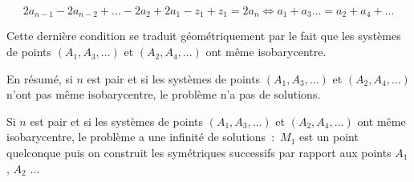{{$$2a_{n-1}-2a_{n-2}+...-2a_2+2a_1-z_1+z_1=2a_n\Leftrightarrow a_1+a_3...=a_2+a_4+...$$

Cette dernière condition se traduit géométriquement par le fait que les systèmes de points $(A_1,A_3,...)$ et
$(A_2,A_4,...)$ ont même isobarycentre.

En résumé, si $n$ est pair et si les systèmes de points $(A_1,A_3,...)$ et $(A_2,A_4,...)$ n'ont pas même isobarycentre, le problème n'a pas de solutions.

Si $n$ est pair et si les systèmes de points $(A_1,A_3,...)$ et $(A_2,A_4,...)$ ont même isobarycentre, le problème a une infinité de solutions~:~$M_1$ est un point quelconque puis on construit les symétriques successifs par rapport aux points $A_1$, $A_2$ ...}
}